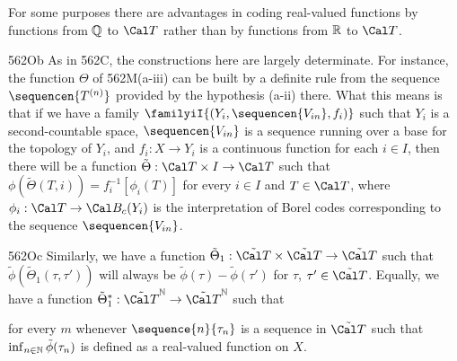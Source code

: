  For some purposes there are advantages
in coding real-valued functions by functions from $\Bbb Q$ to $\Cal T$
rather than by functions
from $\Bbb R$ to $\Cal T$.

\spheader 562Ob As in 562C,
 the constructions here
are largely determinate.    For instance, the function $\Theta$ of
562M(a-iii) can be built by a definite rule from the sequence
$\sequencen{T^{(n)}}$ provided by the hypothesis (a-ii) there.
What this means is that if we have a family
$\familyiI{(Y_i,\sequencen{V_{in}},f_i)}$ such that $Y_i$ is a
second-countable space, $\sequencen{V_{in}}$ is a sequence running over a
base for the topology of $Y_i$, and $f_i:X\to Y_i$ is a continuous function
for each $i\in I$, then there will be a function
$\tilde\Theta:\Cal T\times I\to\Cal T$ such that
$\phi(\tilde\Theta(T,i))=f_i^{-1}[\phi_i(T)]$ for every $i\in I$ and
$T\in\Cal T$, where $\phi_i:\Cal T\to\Cal B_c(Y_i)$ is the interpretation
of Borel codes
corresponding to the sequence $\sequencen{V_{in}}$.   

\spheader 562Oc Similarly, we have a function
$\tilde\Theta_1:\tilde{\Cal T}\times\tilde{\Cal T}\to\tilde{\Cal T}$
such that
$\tilde\phi(\tilde\Theta_1(\tau,\tau'))$ will always be
$\tilde\phi(\tau)-\tilde\phi(\tau')$
for $\tau$, $\tau'\in\tilde{\Cal T}$.
Equally, we have a function
$\tilde\Theta_1^*:\tilde{\Cal T}^{\Bbb N}\to\tilde{\Cal T}^{\Bbb N}$ such
that


\noindent for every $m$
whenever $\sequence{n}{\tau_n}$ is a sequence in $\tilde{\Cal T}$
such that $\inf_{n\in\Bbb N}\tilde\phi(\tau_n)$ is defined as a real-valued
function on $X$.   


